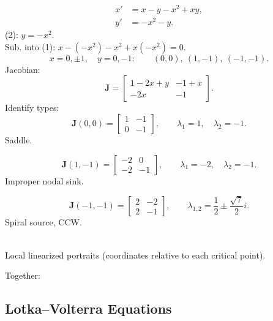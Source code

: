 \begin{example}
  \begin{align*}
    x' & =x-y-x^2+xy,\tag{1} \\
    y' & =-x^2-y.\tag{2}
  \end{align*}
  (2): $y=-x^2$.\\
  Sub. into (1): $x-(-x^2)-x^2+x(-x^2)=0$.
  \[
    x=0,\pm1,\quad y=0,-1:\qquad (0,0),\ (1,-1),\ (-1,-1).
  \]
  Jacobian:
  \[
    \mathbf{J}=
    \begin{bmatrix}
      1-2x+y & -1+x \\-2x&-1
    \end{bmatrix}
    .
  \]
  Identify types:
  \[
    \mathbf{J}(0,0)=
    \begin{bmatrix}
      1 & -1 \\0&-1
    \end{bmatrix}
    ,\qquad
    \lambda_1=1,\quad\lambda_2=-1.
  \]
  Saddle.
  \begin{center}
    
  \end{center}
  \[
    \mathbf{J}(1,-1)=
    \begin{bmatrix}
      -2 & 0 \\-2&-1
    \end{bmatrix}
    ,\qquad
    \lambda_1=-2,\quad\lambda_2=-1.
  \]
  Improper nodal sink.
  \begin{center}
    
  \end{center}
  \[
    \mathbf{J}(-1,-1)=
    \begin{bmatrix}
      2 & -2 \\2&-1
    \end{bmatrix}
    ,\qquad
    \lambda_{1,2}=\frac12\pm\frac{\sqrt7}{2}i.
  \]
  Spiral source, CCW.
  \begin{center}
    \\
    Local linearized portraits (coordinates relative to each critical point).
  \end{center}
  \begin{center}
    \begin{minipage}{\linewidth}
      \centering Together:\\
      
    \end{minipage}
  \end{center}
\end{example}

\subsection{Lotka--Volterra Equations}

